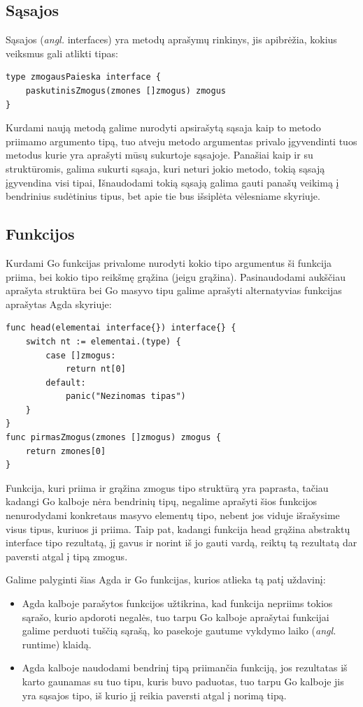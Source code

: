 \documentclass{VUMIFPSkursinis}
\begin{document}
\subsection{Sąsajos}
Sąsajos (\textit{angl.} interfaces) yra metodų aprašymų rinkinys, jis apibrėžia, kokius veiksmus gali atlikti tipas:
\begin{lstlisting}[language=GoCust]
type zmogausPaieska interface {
	paskutinisZmogus(zmones []zmogus) zmogus
}
\end{lstlisting}
Kurdami naują metodą galime nurodyti apsirašytą sąsaja kaip to metodo priimamo argumento tipą, tuo atveju metodo argumentas privalo įgyvendinti tuos metodus kurie yra aprašyti mūsų sukurtoje sąsajoje. Panašiai kaip ir su struktūromis, galima sukurti sąsaja, kuri neturi jokio metodo, tokią sąsają įgyvendina visi tipai, Išnaudodami tokią sąsają galima gauti panašų veikimą į bendrinius sudėtinius tipus, bet apie tie bus išsiplėta vėlesniame skyriuje.
\subsection{Funkcijos}
Kurdami Go funkcijas privalome nurodyti kokio tipo argumentus ši funkcija priima, bei kokio tipo reikšmę grąžina (jeigu grąžina). Pasinaudodami aukščiau aprašyta struktūra bei Go masyvo tipu galime aprašyti alternatyvias funkcijas aprašytas Agda skyriuje:
\begin{lstlisting}[language=GoCust]
func head(elementai interface{}) interface{} {
	switch nt := elementai.(type) {
		case []zmogus:
			return nt[0]
		default:
			panic("Nezinomas tipas")
	}
}
func pirmasZmogus(zmones []zmogus) zmogus {
	return zmones[0]
}
\end{lstlisting}
Funkcija, kuri priima ir grąžina zmogus tipo struktūrą yra paprasta, tačiau kadangi Go kalboje nėra bendrinių tipų, negalime aprašyti šios funkcijos nenurodydami konkretaus masyvo elementų tipo, nebent jos viduje išrašysime visus tipus, kuriuos ji priima. Taip pat, kadangi funkcija head grąžina abstraktų interface{} tipo rezultatą, jį gavus ir norint iš jo gauti vardą, reiktų tą rezultatą dar paversti atgal į tipą zmogus. \par Galime palyginti šias Agda ir Go funkcijas, kurios atlieka tą patį uždavinį:
\begin{itemize}
	\item Agda kalboje parašytos funkcijos užtikrina, kad funkcija nepriims tokios sąrašo, kurio apdoroti negalės, tuo tarpu Go kalboje aprašytai funkcijai galime perduoti tuščią sąrašą, ko pasekoje gautume vykdymo laiko (\textit{angl.} runtime) klaidą.
	\item Agda kalboje naudodami bendrinį tipą priimančia funkciją, jos rezultatas iš karto gaunamas su tuo tipu, kuris buvo paduotas, tuo tarpu Go kalboje jis yra sąsajos tipo, iš kurio jį reikia paversti atgal į norimą tipą.
\end{itemize}
\end{document}
